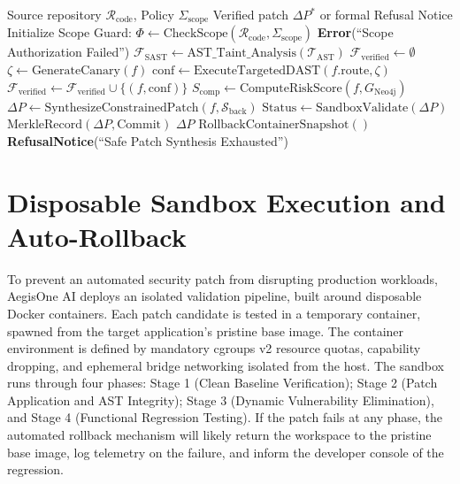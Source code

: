 \documentclass[journal,twoside]{IEEEtran}
\begin{document}
\begin{algorithm}[!b]
\caption{AegisOne AI Closed-Loop Verification Pipeline}
\label{alg:verification}
\begin{algorithmic}[1]
\REQUIRE Source repository $\mathcal{R}_{\text{code}}$, Policy $\Sigma_{\text{scope}}$
\ENSURE Verified patch $\Delta P^*$ or formal Refusal Notice
\STATE Initialize Scope Guard: $\Phi \leftarrow \text{CheckScope}(\mathcal{R}_{\text{code}}, \Sigma_{\text{scope}})$
 \RETURN \textbf{Error}(``Scope Authorization Failed'') \ENDIF
\STATE $\mathcal{F}_{\text{SAST}} \leftarrow \text{AST\_Taint\_Analysis}(\mathcal{T}_{\text{AST}})$
\STATE $\mathcal{F}_{\text{verified}} \leftarrow \emptyset$
    \STATE $\zeta \leftarrow \text{GenerateCanary}(f)$
    \STATE $\text{conf} \leftarrow \text{ExecuteTargetedDAST}(f.\text{route}, \zeta)$
        \STATE $\mathcal{F}_{\text{verified}} \leftarrow \mathcal{F}_{\text{verified}} \cup \{ (f, \text{conf}) \}$
    \ENDIF
\ENDFOR
{}
    \STATE $S_{\text{comp}} \leftarrow \text{ComputeRiskScore}(f, G_{\text{Neo4j}})$
        \STATE $\Delta P \leftarrow \text{SynthesizeConstrainedPatch}(f, \mathcal{S}_{\text{back}})$
            \STATE $\text{Status} \leftarrow \text{SandboxValidate}(\Delta P)$
                \STATE $\text{MerkleRecord}(\Delta P, \text{Commit})$
                \RETURN $\Delta P$
            \ELSE
                \STATE $\text{RollbackContainerSnapshot}()$
            \ENDIF
        \ENDIF
    \ENDIF
\ENDFOR
\RETURN \textbf{RefusalNotice}(``Safe Patch Synthesis Exhausted'')
\end{algorithmic}
\end{algorithm}

\section{Disposable Sandbox Execution and Auto-Rollback}
To prevent an automated security patch from disrupting production workloads, AegisOne AI deploys an isolated validation pipeline, built around disposable Docker containers. Each patch candidate is tested in a temporary container, spawned from the target application's pristine base image. The container environment is defined by mandatory cgroups v2 resource quotas, capability dropping, and ephemeral bridge networking isolated from the host. The sandbox runs through four phases: Stage 1 (Clean Baseline Verification); Stage 2 (Patch Application and AST Integrity); Stage 3 (Dynamic Vulnerability Elimination), and Stage 4 (Functional Regression Testing). If the patch fails at any phase, the automated rollback mechanism will likely return the workspace to the pristine base image, log telemetry on the failure, and inform the developer console of the regression.
\end{document}

